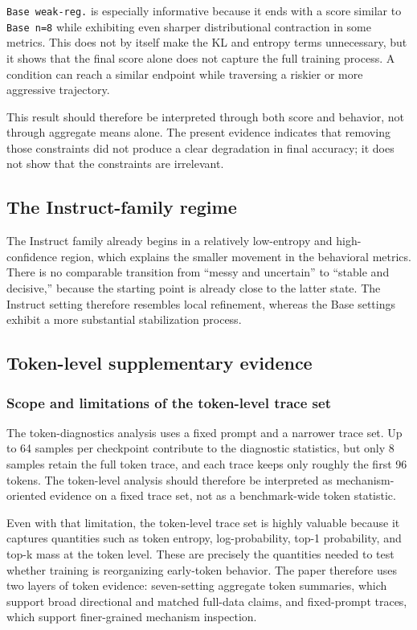 \documentclass[12pt,a4paper]{ctexart}
\begin{document}
\texttt{Base weak-reg.} is especially informative because it ends with a score similar to \texttt{Base n=8} while exhibiting even sharper distributional contraction in some metrics. This does not by itself make the KL and entropy terms unnecessary, but it shows that the final score alone does not capture the full training process. A condition can reach a similar endpoint while traversing a riskier or more aggressive trajectory.

This result should therefore be interpreted through both score and behavior, not through aggregate means alone. The present evidence indicates that removing those constraints did not produce a clear degradation in final accuracy; it does not show that the constraints are irrelevant.

\subsection{The Instruct-family regime}

The Instruct family already begins in a relatively low-entropy and high-confidence region, which explains the smaller movement in the behavioral metrics. There is no comparable transition from ``messy and uncertain'' to ``stable and decisive,'' because the starting point is already close to the latter state. The Instruct setting therefore resembles local refinement, whereas the Base settings exhibit a more substantial stabilization process.

\subsection{Token-level supplementary evidence}

\subsubsection{Scope and limitations of the token-level trace set}

The token-diagnostics analysis uses a fixed prompt and a narrower trace set. Up to 64 samples per checkpoint contribute to the diagnostic statistics, but only 8 samples retain the full token trace, and each trace keeps only roughly the first 96 tokens. The token-level analysis should therefore be interpreted as mechanism-oriented evidence on a fixed trace set, not as a benchmark-wide token statistic.

Even with that limitation, the token-level trace set is highly valuable because it captures quantities such as token entropy, log-probability, top-1 probability, and top-k mass at the token level. These are precisely the quantities needed to test whether training is reorganizing early-token behavior. The paper therefore uses two layers of token evidence: seven-setting aggregate token summaries, which support broad directional and matched full-data claims, and fixed-prompt traces, which support finer-grained mechanism inspection.
\end{document}
